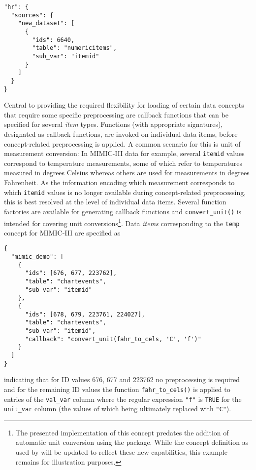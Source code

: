 \documentclass[
  notitle,
  nojss,
  noheadings]{jss}
\begin{document}
\begin{verbatim}
"hr": {
  "sources": {
    "new_dataset": [
      {
        "ids": 6640,
        "table": "numericitems",
        "sub_var": "itemid"
      }
    ]
  }
}
\end{verbatim}

Central to providing the required flexibility for loading of certain
data concepts that require some specific preprocessing are callback
functions that can be specified for several \emph{item} types. Functions
(with appropriate signatures), designated as callback functions, are
invoked on individual data items, before concept-related preprocessing
is applied. A common scenario for this is unit of measurement
conversion: In MIMIC-III data for example, several \texttt{itemid}
values correspond to temperature measurements, some of which refer to
temperatures measured in degrees Celsius whereas others are used for
measurements in degrees Fahrenheit. As the information encoding which
measurement corresponds to which \texttt{itemid} values is no longer
available during concept-related preprocessing, this is best resolved at
the level of individual data items. Several function factories are
available for generating callback functions and \texttt{convert\_unit()}
is intended for covering unit conversions\footnote{The presented
  implementation of this concept predates the addition of automatic unit
  conversion using the  package. While the concept definition
  as used by  will be updated to reflect these new
  capabilities, this example remains for illustration purposes.}. Data
\emph{items} corresponding to the \texttt{temp} concept for MIMIC-III
are specified as

\begin{verbatim}
{
  "mimic_demo": [
    {
      "ids": [676, 677, 223762],
      "table": "chartevents",
      "sub_var": "itemid"
    },
    {
      "ids": [678, 679, 223761, 224027],
      "table": "chartevents",
      "sub_var": "itemid",
      "callback": "convert_unit(fahr_to_cels, 'C', 'f')"
    }
  ]
}
\end{verbatim}

indicating that for ID values 676, 677 and 223762 no preprocessing is
required and for the remaining ID values the function
\texttt{fahr\_to\_cels()} is applied to entries of the \texttt{val\_var}
column where the regular expression \texttt{"f"} is \texttt{TRUE} for
the \texttt{unit\_var} column (the values of which being ultimately
replaced with \texttt{"C"}).
\end{document}
